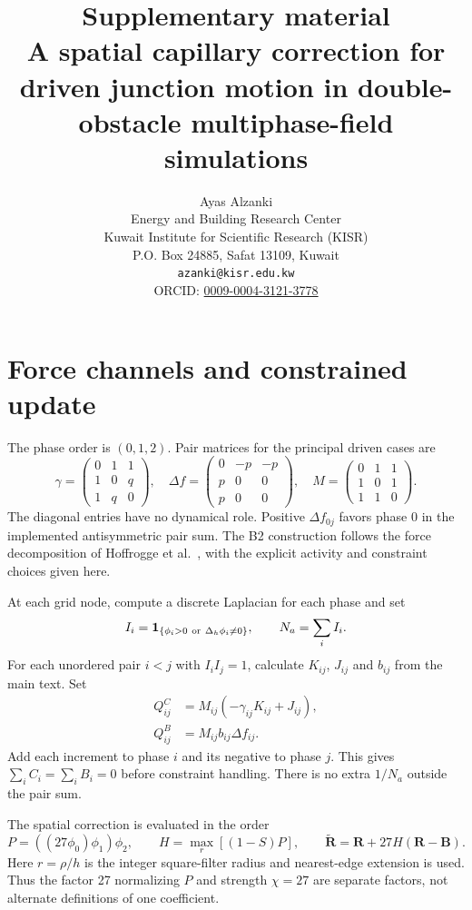 \documentclass[a4paper,11pt]{article}
\title{Supplementary material\\[5pt]\large A spatial capillary correction for driven junction motion in double-obstacle multiphase-field simulations}
\author{Ayas Alzanki\\[3pt]\small Energy and Building Research Center\\\small Kuwait Institute for Scientific Research (KISR)\\\small P.O. Box 24885, Safat 13109, Kuwait\\\small \texttt{azanki@kisr.edu.kw}\\\small ORCID: \href{https://orcid.org/0009-0004-3121-3778}{0009-0004-3121-3778}}
\date{}
\begin{document}
\maketitle

\section{Force channels and constrained update}
The phase order is $(0,1,2)$. Pair matrices for the principal driven cases are
\begin{equation}
 \gamma=\begin{pmatrix}0&1&1\\1&0&q\\1&q&0\end{pmatrix},
 \quad \Delta f=\begin{pmatrix}0&-p&-p\\p&0&0\\p&0&0\end{pmatrix},
 \quad M=\begin{pmatrix}0&1&1\\1&0&1\\1&1&0\end{pmatrix}.
\end{equation}
The diagonal entries have no dynamical role. Positive $\Delta f_{0j}$ favors phase 0 in the implemented antisymmetric pair sum. The B2 construction follows the force decomposition of Hoffrogge et al.\ \citep{hoffrogge2025}, with the explicit activity and constraint choices given here.

At each grid node, compute a discrete Laplacian for each phase and set
\begin{equation}
 I_i=\mathbf1_{\{\phi_i>0\ {\rm or}\ \Delta_h\phi_i\ne0\}},
 \qquad N_a=\sum_i I_i .
\end{equation}
For each unordered pair $i<j$ with $I_iI_j=1$, calculate $K_{ij}$, $J_{ij}$ and $b_{ij}$ from the main text. Set
\begin{align}
 Q^C_{ij}&=M_{ij}(-\gamma_{ij}K_{ij}+J_{ij}),\\
 Q^B_{ij}&=M_{ij}b_{ij}\Delta f_{ij}.
\end{align}
Add each increment to phase $i$ and its negative to phase $j$. This gives $\sum_i C_i=\sum_i B_i=0$ before constraint handling. There is no extra $1/N_a$ outside the pair sum.

The spatial correction is evaluated in the order
\begin{equation}
 P=((27\phi_0)\phi_1)\phi_2,\qquad
 H=\operatorname{max}_{r}[(1-S)P],\qquad
 \widetilde{\mathbf R}=\mathbf R+27H(\mathbf R-\mathbf B).
\end{equation}
Here $r=\rho/h$ is the integer square-filter radius and nearest-edge extension is used. Thus the factor 27 normalizing $P$ and strength $\chi=27$ are separate factors, not alternate definitions of one coefficient.
\end{document}
